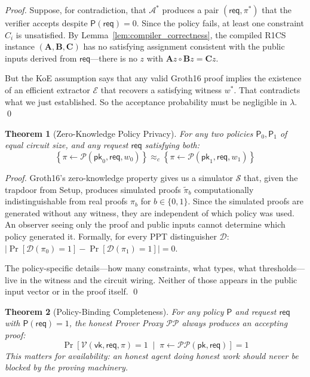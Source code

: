 \documentclass[10pt,conference]{IEEEtran}
\newtheorem{theorem}{Theorem}
\begin{document}
\begin{proof}
Suppose, for contradiction, that $\mathcal{A}^*$ produces a pair $(\mathsf{req}, \pi^*)$ that the verifier accepts despite $\mathsf{P}(\mathsf{req}) = 0$. Since the policy fails, at least one constraint $C_i$ is unsatisfied. By Lemma~\ref{lem:compiler_correctness}, the compiled R1CS instance $(\mathbf{A}, \mathbf{B}, \mathbf{C})$ has no satisfying assignment consistent with the public inputs derived from $\mathsf{req}$---there is no $z$ with $\mathbf{A}z \circ \mathbf{B}z = \mathbf{C}z$.

But the KoE assumption says that any valid Groth16 proof implies the existence of an efficient extractor $\mathcal{E}$ that recovers a satisfying witness $w^*$. That contradicts what we just established. So the acceptance probability must be negligible in $\lambda$. \qed
\end{proof}

\begin{theorem}[Zero-Knowledge Policy Privacy]
\label{thm:privacy}
For any two policies $\mathsf{P}_0, \mathsf{P}_1$ of equal circuit size, and any request $\mathsf{req}$ satisfying both:
\[
\left\{\pi \leftarrow \mathcal{P}(\mathsf{pk}_0, \mathsf{req}, w_0)\right\} \approx_c \left\{\pi \leftarrow \mathcal{P}(\mathsf{pk}_1, \mathsf{req}, w_1)\right\}
\]
\end{theorem}

\begin{proof}
Groth16's zero-knowledge property gives us a simulator $\mathcal{S}$ that, given the trapdoor from Setup, produces simulated proofs $\tilde{\pi}_b$ computationally indistinguishable from real proofs $\pi_b$ for $b \in \{0, 1\}$. Since the simulated proofs are generated without any witness, they are independent of which policy was used. An observer seeing only the proof and public inputs cannot determine which policy generated it. Formally, for every PPT distinguisher $\mathcal{D}$: $|\Pr[\mathcal{D}(\pi_0)=1] - \Pr[\mathcal{D}(\pi_1)=1]| = 0$.

The policy-specific details---how many constraints, what types, what thresholds---live in the witness and the circuit wiring. Neither of those appears in the public input vector or in the proof itself. \qed
\end{proof}

\begin{theorem}[Policy-Binding Completeness]
\label{thm:completeness}
For any policy $\mathsf{P}$ and request $\mathsf{req}$ with $\mathsf{P}(\mathsf{req}) = 1$, the honest Prover Proxy $\mathcal{PP}$ always produces an accepting proof:
\[
\Pr\left[\mathcal{V}(\mathsf{vk}, \mathsf{req}, \pi) = 1 \;\middle|\; \pi \leftarrow \mathcal{PP}(\mathsf{pk}, \mathsf{req})\right] = 1
\]
This matters for availability: an honest agent doing honest work should never be blocked by the proving machinery.
\end{theorem}
\end{document}

